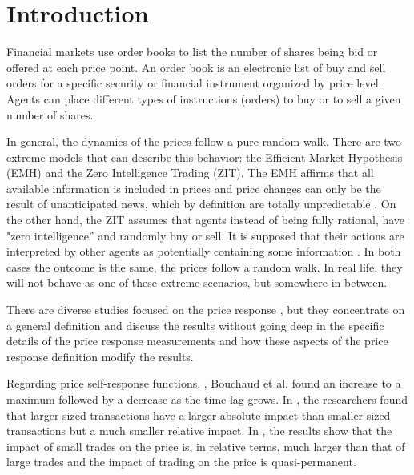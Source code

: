 \section{Introduction}\label{sec:introduction}

Financial markets use order books to list the number of shares being bid or
offered at each price point. An order book is an electronic list of buy and
sell orders for a specific security or financial instrument organized by price
level. Agents can place different types of instructions (orders) to buy or to
sell a given number of shares.

In general, the dynamics of the prices follow a pure random walk. There are two
extreme models that can describe this behavior: the Efficient Market Hypothesis
(EMH) and the Zero Intelligence Trading (ZIT). The EMH affirms that all
available information is included in prices and price changes can only be the
result of unanticipated news, which by definition are totally unpredictable
\cite{subtle_nature,EMH_lillo}. On the other hand, the ZIT assumes that agents
instead of being fully rational, have "zero intelligence” and randomly buy or
sell. It is supposed that their actions are interpreted by other agents as
potentially containing some information \cite{subtle_nature,Wang_2016_cross}.
In both cases the outcome is the same, the prices follow a random walk.
In real life, they will not behave as one of these extreme scenarios, but
somewhere in between.

There are diverse studies focused on the price response
\cite{dissecting_cross,r_walks_liquidity,subtle_nature,Bouchaud_2004,large_prices_changes,pow_law_dist,theory_market_impact,spread_changes_affect,master_curve,EMH_lillo,quant_stock_price_response,ori_pow_law,prop_order_book,Wang_2018_b,Wang_2018_a,Wang_2016_avg,Wang_2016_cross},
but they concentrate on a general definition and discuss the results without
going deep in the specific details of the price response measurements and how
these aspects of the price response definition modify the results.

Regarding price self-response functions,
\cite{r_walks_liquidity,subtle_nature,Bouchaud_2004}, Bouchaud et al. found
an increase to a maximum followed by a decrease as the time lag grows.
In \cite{theory_market_impact}, the researchers found that larger sized
transactions have a larger absolute impact than smaller sized transactions but
a much smaller relative impact. In \cite{prop_order_book}, the results show
that the impact of small trades on the price is, in relative terms, much larger
than that of large trades and the impact of trading on the price is
quasi-permanent.

